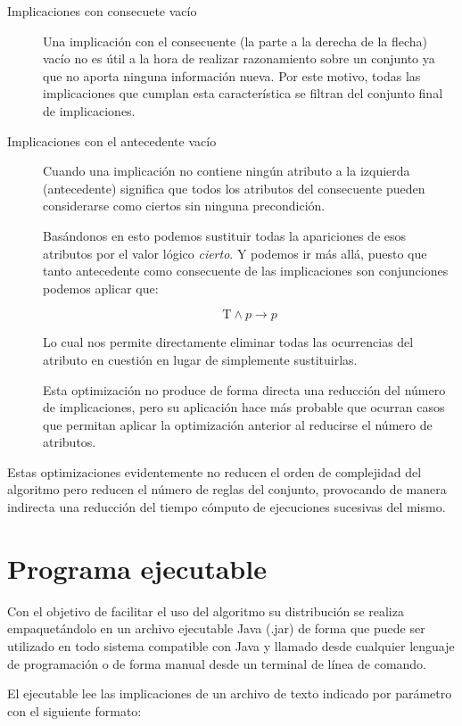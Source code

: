 	\begin{description}
		\item[Implicaciones con consecuete vacío] 
			Una implicación con el 	consecuente (la parte a la derecha de la flecha) vacío no es útil a la hora de realizar razonamiento sobre un conjunto ya que no aporta ninguna información nueva. Por este motivo, todas las implicaciones que cumplan esta característica se filtran del conjunto final de implicaciones.
		\item[Implicaciones con el antecedente vacío] 
			Cuando una implicación no contiene ningún atributo a la izquierda (antecedente) significa que todos los atributos del consecuente pueden considerarse como ciertos sin ninguna precondición. 
	
			Basándonos en esto podemos sustituir todas la apariciones de esos atributos por el valor lógico \textit{cierto}. Y podemos ir más allá, puesto que tanto antecedente como consecuente de las implicaciones son conjunciones podemos aplicar que:
			
			\[
				\text{T} \wedge p \rightarrow p
			\]		
			
			Lo cual nos permite directamente eliminar todas las ocurrencias del atributo en cuestión en lugar de simplemente sustituirlas. 
			
			Esta optimización no produce de forma directa una reducción del número de implicaciones, pero su aplicación hace más probable que ocurran casos que permitan aplicar la optimización anterior al reducirse el número de atributos.	
	\end{description}


	Estas optimizaciones evidentemente no reducen el orden de complejidad del algoritmo pero reducen el número de reglas del conjunto, provocando de manera indirecta una reducción del tiempo cómputo de ejecuciones sucesivas del mismo.
	
\section*{Programa ejecutable}

	Con el objetivo de facilitar el uso del algoritmo su distribución se realiza empaquetándolo en un archivo ejecutable Java (.jar) de forma que puede ser utilizado en todo sistema compatible con Java y llamado desde cualquier lenguaje de programación o de forma manual desde un terminal de línea de comando. 	
	
	El ejecutable lee las implicaciones de un archivo de texto indicado por parámetro con el siguiente formato:
	
